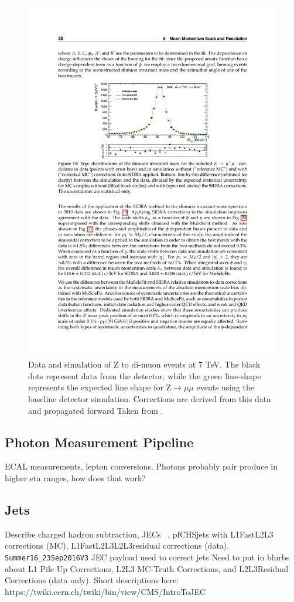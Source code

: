     \begin{figure}[h!]
      \centering
      \includegraphics[width=.7\textwidth]{figures/muon_Z_resolution.pdf}
      \caption{Data and simulation of Z to di-muon events at 7 TeV. The black dots represent data from the detector, while the green line-shape represents the expected line shape for Z$\to\mu\mu$ events using the baseline detector simulation. Corrections are derived from this data and propagated forward Taken from \cite{cms_muons}.}
      \label{fig:muon_Z_resolution}
    \end{figure}
    
  \subsection{Photon Measurement Pipeline}
    ECAL measurements, lepton conversions. Photons probably pair produce in higher eta ranges, how does that work?
  \subsection{Jets} \label{sec:jets}
    Describe charged hadron subtraction, JECs ~\cite{JERC}, \cite{JEC_2016}
    pfCHSjets with L1FastL2L3 corrections (MC), L1FastL2L3L2L3residual corrections (data).
    \verb=Summer16_23Sep2016V3= JEC payload used to correct jets
    Need to put in blurbs about L1 Pile Up Corrections, L2L3 MC-Truth Corrections, and L2L3Residual Corrections (data only). Short descriptions here: https://twiki.cern.ch/twiki/bin/view/CMS/IntroToJEC 

